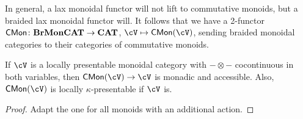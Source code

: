 \documentclass[a4paper,11pt,oneside,openany]{scrbook}
\begin{document}
\begin{rmk}
	In general, a lax monoidal functor will not lift to commutative monoids, but a braided lax monoidal functor will. It follows that we have a 2-functor $\operatorname{\mathsf{CMon}}\colon\textbf{BrMonCAT}\rightarrow{\normalfont\textbf{CAT}}$, $\cV\mapsto\CMon(\cV)$, sending braided monoidal categories to their categories of commutative monoids.
\end{rmk}

\begin{thm}
	If $\cV$ is a locally presentable monoidal category with $-\otimes -$ cocontinuous in both variables, then $\CMon(\cV)\rightarrow\cV$ is monadic and accessible. Also, $\CMon(\cV)$ is locally $\kappa$-presentable if $\cV$ is.
\end{thm}

\begin{proof}
	Adapt the one for all monoids with an additional action.
\end{proof}
\end{document}
